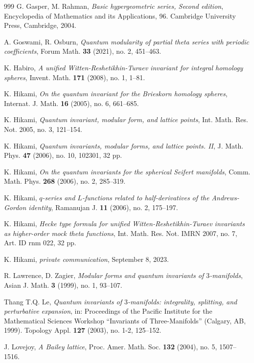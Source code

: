 \documentclass[11pt,reqno]{amsart}
\theoremstyle{definition}
\numberwithin{equation}{section}
\renewcommand{\=}{\;=\;}
\begin{document}
\begin{thebibliography}{999}
G. Gasper, M. Rahman, \emph{Basic hypergeometric series, Second edition}, Encyclopedia of Mathematics and its Applications, 96. Cambridge University Press, Cambridge, 2004.

A. Goswami, R. Osburn, \emph{Quantum modularity of partial theta series with periodic coefficients}, Forum Math. \textbf{33} (2021), no. 2, 451--463.

K. Habiro, \emph{A unified Witten-Reshetikhin-Turaev invariant for integral homology spheres}, Invent. Math. \textbf{171} (2008), no. 1, 1--81.

K. Hikami, \emph{On the quantum invariant for the Brieskorn homology spheres}, Internat. J. Math. \textbf{16} (2005), no. 6, 661--685.

K. Hikami, \emph{Quantum invariant, modular form, and lattice points}, Int. Math. Res. Not. 2005, no. 3, 121--154.

K. Hikami, \emph{Quantum invariants, modular forms, and lattice points. II}, J. Math. Phys. \textbf{47} (2006), no. 10, 102301, 32 pp.

K. Hikami, \emph{On the quantum invariants for the spherical Seifert manifolds}, Comm. Math. Phys. \textbf{268} (2006), no. 2, 285--319.

K. Hikami, \emph{$q$-series and $L$-functions related to half-derivatives of the Andrews-Gordon identity}, Ramanujan J. \textbf{11} (2006), no. 2, 175--197.

K. Hikami, \emph{Hecke type formula for unified Witten-Reshetikhin-Turaev invariants as higher-order mock theta functions}, Int. Math. Res. Not. IMRN 2007, no. 7, Art. ID rnm 022, 32 pp.

K. Hikami, \emph{private communication}, September 8, 2023.

R. Lawrence, D. Zagier, \emph{Modular forms and quantum invariants of $3$-manifolds}, Asian J. Math. \textbf{3} (1999), no. 1, 93--107.

Thang T.Q. Le, \emph{Quantum invariants of $3$-manifolds: integrality, splitting, and perturbative expansion}, in: Proceedings of the Pacific Institute for the Mathematical Sciences Workshop ``Invariants of Three-Manifolds'' (Calgary, AB, 1999). Topology Appl. \textbf{127} (2003), no. 1-2, 125--152.

J. Lovejoy, \emph{A Bailey lattice}, Proc. Amer. Math. Soc. {\bf 132} (2004), no. 5, 1507--1516.


\end{thebibliography}
\end{document}
